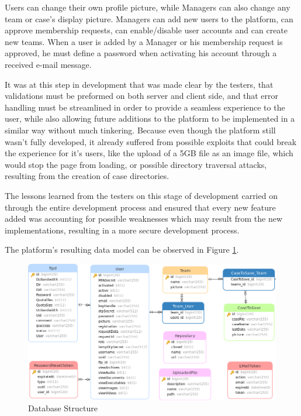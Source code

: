Users can change their own profile picture, while Managers can also change any team or case's display picture.
Managers can add new users to the platform, can approve membership requests, can enable/disable user accounts and can create new teams.
When a user is added by a Manager or his membership request is approved, he must define a password when activating his account through a received e-mail message.

It was at this step in development that was made clear by the testers, that validations must be preformed on both server and client side, and that error handling must be streamlined
in order to provide a seamless experience to the user, while also allowing future additions to the platform to be implemented in a similar way without much tinkering. Because even though 
the platform still wasn't fully developed, it already suffered from possible exploits that could break the experience for it's users, like the upload of a 5GB file as an image file, which would stop the page from loading, 
or possible directory traversal attacks, resulting from the creation of case directories.

The lessons learned from the testers on this stage of development carried on through the entire development process and ensured that every new feature added was accounting for possible weaknesses which may result from the new 
implementations, resulting in a more secure development process.

The platform's resulting data model can be observed in Figure \ref{fig:database}.

\begin{figure}[ht]
 \centering
 \includegraphics[width=1\linewidth]{imgs/database.png}
 \caption{Database Structure}
 \label{fig:database}
\end{figure}

